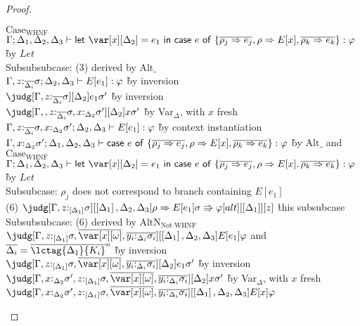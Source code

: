 \begin{proof}
\begin{tabbing}
$\textrm{Case}_\textrm{WHNF}$\\
$\G ; \D_1 , \D_2 , \D_3 \vdash \llet{\x[\D_2] = e_1}{\ccase{e}{\{\overline{\rho_j\Rightarrow e_j}, \rho \Rightarrow
           E[x], \overline{\rho_k\Rightarrow e_k}\}}} : \vp$ \` by
       $\mathit{Let}$\\
       Subsubsubcase: (3) derived by $\textrm{Alt}\_$\\
       $\Gamma , z{:}_{\overline{\Delta_i}} \sigma; \Delta_2,\Delta_3 \vdash E[e_1] : \varphi$ \` by inversion\\
       $\judg[\G , z{:}_{\ov{\Delta_i}} \sigma][\D_2]{e_1}{\sigma'}$
       \` by inversion\\
       $\judg[\G, , z{:}_{\ov{\Delta_i}} \sigma ,x{:}_{\D_2}\sigma'][\D_2]{x}{\sigma'}$ \` by Var$_\Delta$, with $x$ fresh\\
       $\Gamma, z{:}_{\overline{\Delta_i}} \sigma ,x{:}_{\Delta_2}\sigma'; \Delta_2,\Delta_3 \vdash E[e_1] : \varphi$ \` by
       context instantiation\\
       $\Gamma,x{:}_{\Delta_2}\sigma'; \Delta_1,\Delta_2,\Delta_3 \vdash \mathsf{case}~e~\mathsf{of}~\{\overline{\rho_j\Rightarrow e_j}, \rho \Rightarrow
  E[x], \overline{\rho_k\Rightarrow e_k}\} : \varphi$ \` by $\textrm{Alt}\_$ and
$\textrm{Case}_\textrm{WHNF}$\\
       $\G ; \D_1 , \D_2 , \D_3 \vdash \llet{\x[\D_2] = e_1}{\ccase{e}{\{\overline{\rho_j\Rightarrow e_j}, \rho \Rightarrow
           E[x], \overline{\rho_k\Rightarrow e_k}\}}} : \vp$ \` by
       $\mathit{Let}$\\
       Subsubcase: $\rho_j$ does not correspond to branch containing
       $E[e_1]$\\
       (6) $\judg[\G,z{:}_{\irr{\D_1}}\s][\irr{\D_1},\D_2,\D_3]{\rho\Rightarrow E[e_1]}{\s
         \Rrightarrow \vp}[alt][\irr{\D_1}][z]$ \` this subsubcase\\
       Subsubsubcase: (6) derived by $\textrm{AltN}_{\textrm{Not
           WHNF}}$\\
       $\judg[\G, z{:}_{\irr{\D_1}}\s,\ov{\xo},\ov{y_i{:}_{\D_i}\s_i}][\irr{\D_1},\D_2,\D_3]{E[e_1]}{\vp}$
       and $\ov{\D_i} = \ov{\lctag{\D_1}{K_i}}^n$ \` by inversion\\
       $\judg[\G,
       z{:}_{\irr{\D_1}}\s,\ov{\xo},\ov{y_i{:}_{\D_i}\s_i}][\D_2]{e_1}{\sigma'}$
       \` by inversion\\
       $\judg[\G,x{:}_{\D_2}\sigma',
       z{:}_{\irr{\D_1}}\s,\ov{\xo},\ov{y_i{:}_{\D_i}\s_i}][\D_2]{x}{\sigma'}$
       \` by Var$_\Delta$, with $x$ fresh\\
       $\judg[\G, x{:}_{\D_2}\sigma', z{:}_{\irr{\D_1}}\s,\ov{\xo},\ov{y_i{:}_{\D_i}\s_i}][\irr{\D_1},\D_2,\D_3]{E[x]}{\vp}$

\end{tabbing}
\end{proof}
